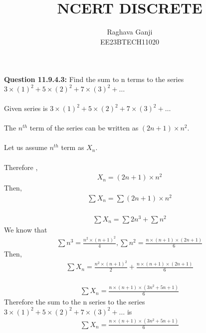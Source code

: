 \documentclass[joournal,12pt,twocolumn]{IEEEtran}
\title{NCERT DISCRETE}
\author{Raghava Ganji\\EE23BTECH11020}
\date{}
\begin{document}
\maketitle
\newpage
\bigskip
\textbf{Question 11.9.4.3:}
Find the sum to n terms to the series $3\times(1)^2+5\times(2)^2+7\times(3)^2+ \ldots$\\
\solution\\
Given series is $3\times(1)^2+5\times(2)^2+7\times(3)^2+ \ldots$\\\\
The $n^{th}$ term of the series can be written as $(2n+1)\times n^2$.\\\\
Let us assume $n^{th}$ term as $X_n$.\\\\
Therefore ,
\begin{align}
X_n=(2n+1)\times n^2
\end{align}
Then,
\begin{align}
\sum X_n=\sum (2n+1)\times n^2
\end{align}\\
\begin{align}
\sum X_n=\sum 2n^3 +\sum n^2
\end{align}
We know that 
\begin{align}
\sum n^3=\frac{n^2\times(n+1)^2}{4}, \sum n^2=\frac{n\times(n+1)\times(2n+1)}{6}
\end{align}
Then,
\begin{align}
\sum X_n=\frac{n^2\times(n+1)^2}{2} +\frac{n\times(n+1)\times(2n+1)}{6}
\end{align}\\
\begin{align}
\sum X_n=\frac{n\times(n+1)\times(3n^2+5n+1)}{6}
\end{align} 
Therefore the sum to the n series to the series $3\times(1)^2+5\times(2)^2+7\times(3)^2+\ldots$ is 
\begin{align}
\sum X_n=\frac{n\times(n+1)\times(3n^2+5n+1)}{6}
\end{align}
\end{document}
